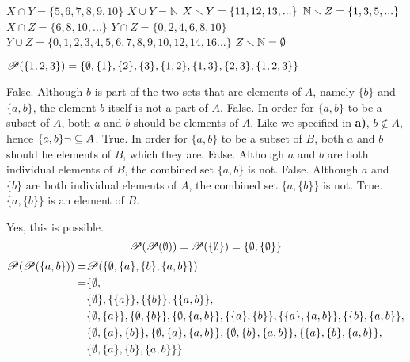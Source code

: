 \begin{solutions}
		\spart{}

	\solution
		\spart $X\cap Y=\{5,6,7,8,9,10\}$
		\spart $X\cup Y=\mathbb{N}$
		\spart $X\smallsetminus Y=\{11,12,13,...\}$
		\spart $\mathbb{N}\smallsetminus Z=\{1,3,5,...\}$
		\spart $X\cap Z=\{6,8,10,...\}$
		\spart $Y\cap Z=\{0,2,4,6,8,10\}$
		\spart $Y\cup Z=\{0,1,2,3,4,5,6,7,8,9,10,12,14,16...\}$
		\spart $Z\smallsetminus \mathbb{N}=\emptyset$

	\solution ${\mathscr P}(\{1,2,3\})=\{\emptyset, \{1\}, \{2\}, \{3\}, \{1,2\}, \{1,3\}, \{2,3\}, \{1,2,3\}\}$

	\solution
		\spart False. Although $b$ is part of the two sets that are elements of $A$, namely $\{b\}$ and $\{a,b\}$, the element $b$ itself is not a part of $A$.
		\spart False. In order for $\{a,b\}$ to be a subset of $A$, both $a$ and $b$ should be elements of $A$. Like we specified in \textbf{a)}, $b\notin A$, hence $\{a,b\}\lnot\subseteq A$.
		\spart True. In order for $\{a,b\}$ to be a subset of $B$, both $a$ and $b$ should be elements of $B$, which they are.
		\spart False. Although $a$ and $b$ are both individual elements of $B$, the combined set $\{a,b\}$ is not.
		\spart False. Although $a$ and $\{b\}$ are both individual elements of $A$, the combined set $\{a,\{b\}\}$ is not.
		\spart True. $\{a, \{b\}\}$ is an element of $B$.

	\solution Yes, this is possible.
	\[{\mathscr P}({\mathscr P}(\emptyset))={\mathscr P}(\{\emptyset\})=\{\emptyset, \{\emptyset\}\}\]
	\begin{align*}
	{\mathscr P}({\mathscr P}(\{a,b\}))=&{\mathscr P}(\{\emptyset, \{a\}, \{b\}, \{a,b\}\})\\
	=&\{\emptyset,\\
	&\{\emptyset\},\{\{a\}\}, \{\{b\}\},\{\{a,b\}\},\\
	&\{\emptyset, \{a\}\}, \{\emptyset, \{b\}\}, \{\emptyset, \{a,b\}\}, \{\{a\}, \{b\}\}, \{\{a\}, \{a,b\}\}, \{\{b\}, \{a,b\}\},\\
	& \{\emptyset, \{a\}, \{b\}\}, \{\emptyset, \{a\}, \{a,b\}\},
	\{\emptyset, \{b\}, \{a,b\}\}, \{\{a\}, \{b\}, \{a,b\}\},\\
	&\{\emptyset, \{a\}, \{b\}, \{a,b\}\}\}
	\end{align*}


\end{solutions}
